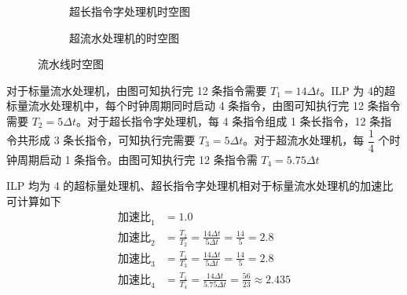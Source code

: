 \documentclass{article}
\begin{document}
\begin{figure}[h]
\begin{subfigure}{.49\textwidth}
\caption{超长指令字处理机时空图}
\label{3}
\end{subfigure}
\begin{subfigure}{.49\textwidth}
\caption{超流水处理机的时空图}
\label{4}
\end{subfigure}
\caption{流水线时空图}
\label{figure:1}
\end{figure}
对于标量流水处理机，由图可知执行完 12 条指令需要 $T_1 = 14 \Delta t$。ILP 为 4的超标量流水处理机中，每个时钟周期同时启动 4 条指令，由图可知执行完 12 条指令需要 $T_2 = 5 \Delta t$。对于超长指令字处理机，每 4 条指令组成 1 条长指令，12 条指令共形成 3 条长指令，可知执行完需要 $T_3 = 5 \Delta t$。对于超流水处理机，每 $\dfrac{1}{4}$ 个时钟周期启动 1 条指令。由图可知执行完 12 条指令需 $T_4 = 5.75 \Delta t$

ILP 均为 4 的超标量处理机、超长指令字处理机相对于标量流水处理机的加速比可计算如下
\begin{align*}
    \text{加速比}_1 &= 1.0 \\
    \text{加速比}_2 &= \frac{T_1}{T_2} = \frac{14 \Delta t}{5 \Delta t} = \frac{14}{5} = 2.8 \\
    \text{加速比}_3 &= \frac{T_1}{T_3} = \frac{14 \Delta t}{5 \Delta t} = \frac{14}{5} = 2.8 \\
    \text{加速比}_4 &= \frac{T_1}{T_4} = \frac{14 \Delta t}{5.75 \Delta t} = \frac{56}{23} \approx 2.435
\end{align*}
\end{document}
